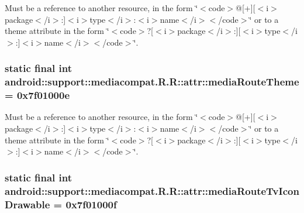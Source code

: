Must be a reference to another resource, in the form \char`\"{}$<$code$>$@\mbox{[}+\mbox{]}\mbox{[}$<$i$>$package$<$/i$>$:\mbox{]}$<$i$>$type$<$/i$>$:$<$i$>$name$<$/i$>$$<$/code$>$\char`\"{} or to a theme attribute in the form \char`\"{}$<$code$>$?\mbox{[}$<$i$>$package$<$/i$>$:\mbox{]}\mbox{[}$<$i$>$type$<$/i$>$:\mbox{]}$<$i$>$name$<$/i$>$$<$/code$>$\char`\"{}. \hypertarget{classandroid_1_1support_1_1mediacompat_1_1_r_1_1attr_94ce75f9b5469d7c54888e6a6da97bde}{
\subsubsection[{mediaRouteTheme}]{\setlength{\rightskip}{0pt plus 5cm}static final int android::support::mediacompat.R.R::attr::mediaRouteTheme = 0x7f01000e}}
\label{classandroid_1_1support_1_1mediacompat_1_1_r_1_1attr_94ce75f9b5469d7c54888e6a6da97bde}


Must be a reference to another resource, in the form \char`\"{}$<$code$>$@\mbox{[}+\mbox{]}\mbox{[}$<$i$>$package$<$/i$>$:\mbox{]}$<$i$>$type$<$/i$>$:$<$i$>$name$<$/i$>$$<$/code$>$\char`\"{} or to a theme attribute in the form \char`\"{}$<$code$>$?\mbox{[}$<$i$>$package$<$/i$>$:\mbox{]}\mbox{[}$<$i$>$type$<$/i$>$:\mbox{]}$<$i$>$name$<$/i$>$$<$/code$>$\char`\"{}. \hypertarget{classandroid_1_1support_1_1mediacompat_1_1_r_1_1attr_d83242917548febc3840d0bbd9f4b3d6}{
\subsubsection[{mediaRouteTvIconDrawable}]{\setlength{\rightskip}{0pt plus 5cm}static final int android::support::mediacompat.R.R::attr::mediaRouteTvIconDrawable = 0x7f01000f}}
\label{classandroid_1_1support_1_1mediacompat_1_1_r_1_1attr_d83242917548febc3840d0bbd9f4b3d6}


